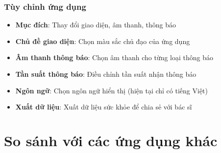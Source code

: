 \documentclass[12pt,a4paper]{article}
\begin{document}
\subsubsection{Tùy chỉnh ứng dụng}
\begin{itemize}[leftmargin=2cm]
    \item \textbf{Mục đích}: Thay đổi giao diện, âm thanh, thông báo
    \item \textbf{Chủ đề giao diện}: Chọn màu sắc chủ đạo của ứng dụng
    \item \textbf{Âm thanh thông báo}: Chọn âm thanh cho từng loại thông báo
    \item \textbf{Tần suất thông báo}: Điều chỉnh tần suất nhận thông báo
    \item \textbf{Ngôn ngữ}: Chọn ngôn ngữ hiển thị (hiện tại chỉ có tiếng Việt)
    \item \textbf{Xuất dữ liệu}: Xuất dữ liệu sức khỏe để chia sẻ với bác sĩ
\end{itemize}

\section{So sánh với các ứng dụng khác}
\end{document}

